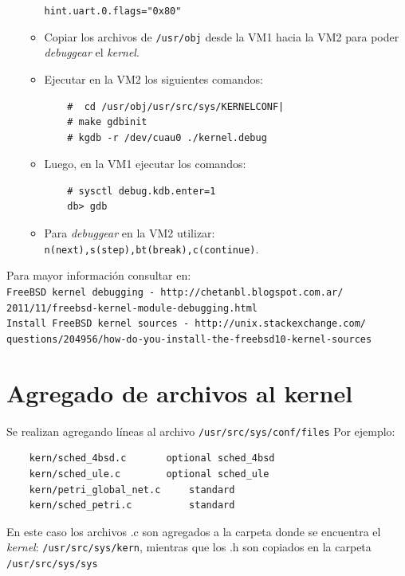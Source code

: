 \documentclass[a4paper]{book}
\begin{document}
\begin{enumerate}
\begin{itemize}
\verb|hint.uart.0.flags="0x80"|\\

\item Copiar los archivos de \verb|/usr/obj| desde la VM1 hacia la VM2 para poder \emph{debuggear} el \emph{kernel}.
\item Ejecutar en la VM2 los siguientes comandos:\\

\begin{verbatim}
	#  cd /usr/obj/usr/src/sys/KERNELCONF|
	# make gdbinit
	# kgdb -r /dev/cuau0 ./kernel.debug
\end{verbatim}

\item Luego, en la VM1 ejecutar los comandos:\\

\begin{verbatim}
 	# sysctl debug.kdb.enter=1
    db> gdb
\end{verbatim}

\item Para \emph{debuggear} en la VM2 utilizar: \\
\verb|n(next),s(step),bt(break),c(continue)|.
\end{itemize}
\end{enumerate}

Para mayor informaci\'on consultar en:\\

\texttt{FreeBSD kernel debugging - http://chetanbl.blogspot.com.ar/}\\
\texttt{2011/11/freebsd-kernel-module-debugging.html}\\

\texttt{Install FreeBSD kernel sources - http://unix.stackexchange.com/}\\
\texttt{questions/204956/how-do-you-install-the-freebsd10-kernel-sources}\\

\section{Agregado de archivos al kernel}

Se realizan agregando l\'ineas al archivo \verb|/usr/src/sys/conf/files|
Por ejemplo:
\begin{verbatim}
	kern/sched_4bsd.c		optional sched_4bsd
	kern/sched_ule.c		optional sched_ule
	kern/petri_global_net.c 	standard
	kern/sched_petri.c      	standard
\end{verbatim}
En este caso los archivos .c son agregados a la carpeta donde se encuentra el \emph{kernel}: \verb|/usr/src/sys/kern|, mientras que los .h son copiados en la carpeta \verb|/usr/src/sys/sys|
\end{document}
